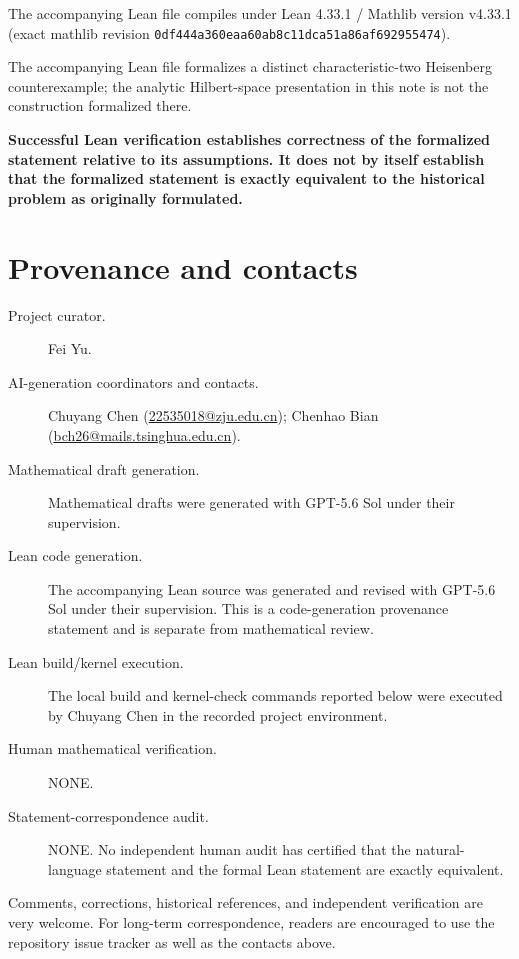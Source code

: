 \documentclass[11pt]{article}
\theoremstyle{remark}
\begin{document}
\medskip
\noindent The accompanying Lean file compiles under Lean 4.33.1 / Mathlib version v4.33.1 (exact mathlib revision \texttt{0df444a360eaa60ab8c11dca51a86af692955474}).

\medskip
\noindent The accompanying Lean file formalizes a distinct characteristic-two Heisenberg counterexample; the analytic Hilbert-space presentation in this note is not the construction formalized there.

\medskip
\noindent\textbf{Successful Lean verification establishes correctness of the formalized statement relative to its assumptions. It does not by itself establish that the formalized statement is exactly equivalent to the historical problem as originally formulated.}
\endgroup

\section*{Provenance and contacts}
\begingroup\small\sloppy
\begin{description}
\item[Project curator.] Fei Yu.
\item[AI-generation coordinators and contacts.] Chuyang Chen (\href{mailto:22535018@zju.edu.cn}{22535018@zju.edu.cn}); Chenhao Bian (\href{mailto:bch26@mails.tsinghua.edu.cn}{bch26@mails.tsinghua.edu.cn}).
\item[Mathematical draft generation.] Mathematical drafts were generated with GPT-5.6 Sol under their supervision.
\item[Lean code generation.] The accompanying Lean source was generated and revised with GPT-5.6 Sol under their supervision. This is a code-generation provenance statement and is separate from mathematical review.
\item[Lean build/kernel execution.] The local build and kernel-check commands reported below were executed by Chuyang Chen in the recorded project environment.
\item[Human mathematical verification.] NONE.
\item[Statement-correspondence audit.] NONE. No independent human audit has certified that the natural-language statement and the formal Lean statement are exactly equivalent.
\end{description}
\medskip
\noindent Comments, corrections, historical references, and independent verification are very welcome. For long-term correspondence, readers are encouraged to use the repository issue tracker as well as the contacts above.
\endgroup
\end{document}
